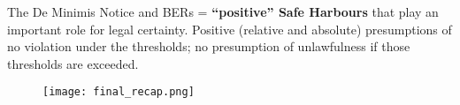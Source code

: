             The De Minimis Notice and BERs = \textbf{“positive” Safe Harbours} that play an important role for legal certainty. Positive (relative and absolute) presumptions of no violation under the thresholds; no presumption of unlawfulness if those thresholds are exceeded.

        
            \begin{figure}[h!]
                \centering
                \texttt{[image: final\_recap.png]}
            \end{figure}